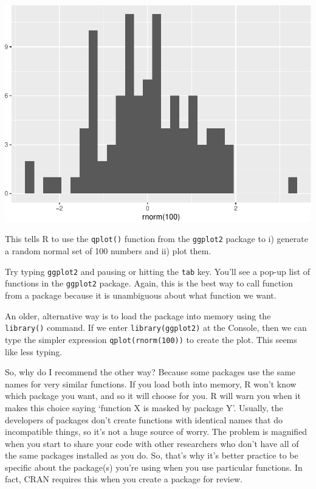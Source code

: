 \documentclass[]{article}
\begin{document}
\includegraphics{slow-r_files/figure-latex/unnamed-chunk-52-1.pdf}

This tells R to use the \texttt{qplot()} function from the
\texttt{ggplot2} package to i) generate a random normal set of 100
numbers and ii) plot them.

Try typing \texttt{ggplot2} and pausing or hitting the \texttt{tab} key.
You'll see a pop-up list of functions in the \texttt{ggplot2} package.
Again, this is the best way to call function from a package because it
is unambiguous about what function we want.

An older, alternative way is to load the package into memory using the
\texttt{library()} command. If we enter
\texttt{library(\textquotesingle{}ggplot2\textquotesingle{})} at the
Console, then we can type the simpler expression
\texttt{qplot(rnorm(100))} to create the plot. This seems like less
typing.

So, why do I recommend the other way? Because some packages use the same
names for very similar functions. If you load both into memory, R won't
know which package you want, and so it will choose for you. R will warn
you when it makes this choice saying `function X is masked by package
Y'. Usually, the developers of packages don't create functions with
identical names that do incompatible things, so it's not a huge source
of worry. The problem is magnified when you start to share your code
with other researchers who don't have all of the same packages installed
as you do. So, that's why it's better practice to be specific about the
package(s) you're using when you use particular functions. In fact, CRAN
requires this when you create a package for review.
\end{document}
